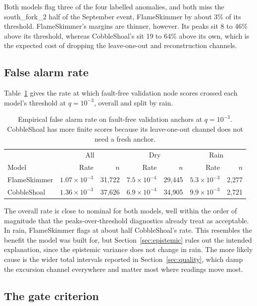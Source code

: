 \documentclass{article}
\begin{document}
Both models flag three of the four labelled anomalies, and both miss the
south\_fork\_2 half of the September event, FlameSkimmer by about 3\% of its
threshold. FlameSkimmer's margins are thinner, however. Its peaks sit 8 to
46\% above its threshold, whereas CobbleShoal's sit 19 to 64\% above its own,
which is the expected cost of dropping the leave-one-out and reconstruction
channels.

\subsection{False alarm rate}
\label{sec:far}

Table~\ref{tab:far} gives the rate at which fault-free validation node scores
crossed each model's threshold at $q = 10^{-3}$, overall and split by rain.

\begin{table}[t]
  \centering
  \caption{Empirical false alarm rate on fault-free validation anchors at
    $q = 10^{-3}$. CobbleShoal has more finite scores because its leave-one-out
    channel does not need a fresh anchor.}
  \label{tab:far}
  \begin{tabular}{lrrrrrr}
    \toprule
     & \multicolumn{2}{c}{All} & \multicolumn{2}{c}{Dry} & \multicolumn{2}{c}{Rain} \\
    Model & Rate & $n$ & Rate & $n$ & Rate & $n$ \\
    \midrule
    FlameSkimmer & $1.07 \times 10^{-3}$ & 31{,}722 & $7.5 \times 10^{-4}$ & 29{,}445 & $5.3 \times 10^{-3}$ & 2{,}277 \\
    CobbleShoal  & $1.36 \times 10^{-3}$ & 37{,}626 & $6.9 \times 10^{-4}$ & 34{,}905 & $9.9 \times 10^{-3}$ & 2{,}721 \\
    \bottomrule
  \end{tabular}
\end{table}

The overall rate is close to nominal for both models, well within the order of
magnitude that the peaks-over-threshold diagnostics already treat as
acceptable. In rain, FlameSkimmer flags at about half CobbleShoal's rate. This
resembles the benefit the model was built for, but
Section~\ref{sec:epistemic} rules out the intended explanation, since the
epistemic variance does not change in rain. The more likely cause is the wider
total intervals reported in Section~\ref{sec:quality}, which damp the
excursion channel everywhere and matter most where readings move most.

\subsection{The gate criterion}
\label{sec:gate}
\end{document}
